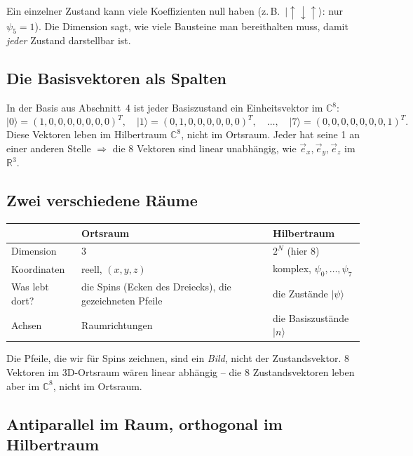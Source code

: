 \documentclass[11pt,a4paper]{article}
\newcommand{\ket}[1]{\lvert #1\rangle}
\newcommand{\up}{{\uparrow}}
\newcommand{\dn}{{\downarrow}}
\begin{document}
Ein einzelner Zustand kann viele Koeffizienten null haben (z.\,B.\ $\ket{\up\dn\up}$: nur $\psi_5 = 1$). Die Dimension sagt, wie viele Bausteine man bereithalten muss, damit \emph{jeder} Zustand darstellbar ist.

\subsection{Die Basisvektoren als Spalten}

In der Basis aus Abschnitt~4 ist jeder Basiszustand ein Einheitsvektor im $\mathbb C^8$:
\[
\ket 0 = (1,0,0,0,0,0,0,0)^T,\quad \ket 1 = (0,1,0,0,0,0,0,0)^T,\quad\dots,\quad \ket 7 = (0,0,0,0,0,0,0,1)^T .
\]
Diese Vektoren leben im Hilbertraum $\mathbb C^8$, nicht im Ortsraum. Jeder hat seine 1 an einer anderen Stelle $\Rightarrow$ die 8 Vektoren sind linear unabhängig, wie $\vec e_x,\vec e_y,\vec e_z$ im $\mathbb R^3$.

\subsection{Zwei verschiedene Räume}

\begin{center}
\begin{tabular}{@{}p{3cm}p{5.2cm}p{5.6cm}@{}}
\toprule
& Ortsraum & Hilbertraum\\
\midrule
Dimension & 3 & $2^N$ (hier 8)\\
Koordinaten & reell, $(x,y,z)$ & komplex, $\psi_0,\dots,\psi_7$\\
Was lebt dort? & die Spins (Ecken des Dreiecks), die gezeichneten Pfeile & die Zustände $\ket\psi$\\
Achsen & Raumrichtungen & die Basiszustände $\ket n$\\
\bottomrule
\end{tabular}
\end{center}

\begin{falle}
Die Pfeile, die wir für Spins zeichnen, sind ein \emph{Bild}, nicht der Zustandsvektor. 8 Vektoren im 3D-Ortsraum wären linear abhängig -- die 8 Zustandsvektoren leben aber im $\mathbb C^8$, nicht im Ortsraum.
\end{falle}

\subsection{Antiparallel im Raum, orthogonal im Hilbertraum}
\end{document}
